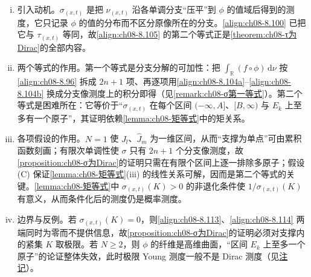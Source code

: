 \documentclass[../../main.tex]{subfiles}%
\begin{document}
\begin{remark}\label{remark:ch08-σ为Dirac}
\begin{enumerate}[(i)]
\item 引入动机。$\sigma_{(x,t)}$ 是把 $\nu_{(x,t)}$ 沿各单调分支“压平”到 $\phi$ 的值域后得到的测度，它只记录 $\phi$ 的值的分布而不区分原像所在的分支。\eqref{align:ch08-8.100} 已把它与 $\tau_{(x,t)}$ 等同，故\eqref{align:ch08-8.105} 的第二个等式正是\cref{theorem:ch08-τ为Dirac}的全部内容。
\item 两个等式的作用。第一个等式是分支分解的可加性：把 $\int_{\mathbb{R}}(f\circ\phi)\,\mathrm{d}\nu$ 按\eqref{align:ch08-8.96} 拆成 $2n+1$ 项、再逐项用\eqref{align:ch08-8.104a}--\eqref{align:ch08-8.104b} 换成分支像测度上的积分即得（见\cref{remark:ch08-σ第一等式}）。第二个等式是困难所在：它等价于“$\sigma_{(x,t)}$ 在每个区间 $(-\infty,A]$、$[B,\infty)$ 与 $E_k$ 上至多有一个原子”，其证明依赖\cref{lemma:ch08-矩等式}中的矩关系。
\item 各项假设的作用。$N=1$ 使 $J_l$、$\widehat J_m$ 为一维区间，从而“支撑为单点”可由累积函数刻画；有限次单调性使 $\sigma$ 只有 $2n+1$ 个分支像测度，故\cref{proposition:ch08-σ为Dirac}的证明只需在有限个区间上逐一排除多原子；假设 (C) 保证\cref{lemma:ch08-矩等式}(iii) 的线性关系可解，因而是第二个等式的关键。\cref{lemma:ch08-矩等式}中 $\sigma_{(x,t)}(K)>0$ 的非退化条件使 $1/\sigma_{(x,t)}(K)$ 有意义，从而条件化后的测度仍是概率测度。
\item 边界与反例。若 $\sigma_{(x,t)}(K)=0$，则\eqref{align:ch08-8.113}、\eqref{align:ch08-8.114} 两端同时为零而不提供信息，故\cref{proposition:ch08-σ为Dirac}的证明必须对支撑内的紧集 $K$ 取极限。若 $N\geqslant2$，则 $\phi$ 的纤维是高维曲面，“区间 $E_k$ 上至多一个原子”的论证整体失效，此时极限 Young 测度一般不是 Dirac 测度（见\hyperref[remark:ch08-Young测度值解]{注记}）。
\end{enumerate}
\end{remark}
\end{document}
